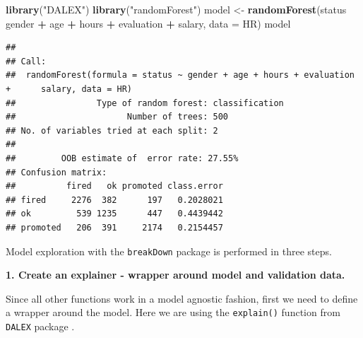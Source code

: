 \documentclass[]{book}
\newenvironment{Shaded}{\begin{snugshade}}{\end{snugshade}}
\newcommand{\ControlFlowTok}[1]{\textcolor[rgb]{0.13,0.29,0.53}{\textbf{#1}}}
\newcommand{\DataTypeTok}[1]{\textcolor[rgb]{0.13,0.29,0.53}{#1}}
\newcommand{\DecValTok}[1]{\textcolor[rgb]{0.00,0.00,0.81}{#1}}
\newcommand{\KeywordTok}[1]{\textcolor[rgb]{0.13,0.29,0.53}{\textbf{#1}}}
\newcommand{\NormalTok}[1]{#1}
\newcommand{\OperatorTok}[1]{\textcolor[rgb]{0.81,0.36,0.00}{\textbf{#1}}}
\newcommand{\StringTok}[1]{\textcolor[rgb]{0.31,0.60,0.02}{#1}}
\theoremstyle{definition}
\theoremstyle{definition}
\theoremstyle{definition}
\theoremstyle{remark}
\begin{document}
\begin{Shaded}
\begin{Highlighting}[]
\KeywordTok{library}\NormalTok{(}\StringTok{"DALEX"}\NormalTok{)}
\KeywordTok{library}\NormalTok{(}\StringTok{"randomForest"}\NormalTok{)}
\NormalTok{model <-}\StringTok{ }\KeywordTok{randomForest}\NormalTok{(status }\OperatorTok{~}\StringTok{ }\NormalTok{gender }\OperatorTok{+}\StringTok{ }\NormalTok{age }\OperatorTok{+}\StringTok{ }\NormalTok{hours }\OperatorTok{+}\StringTok{ }\NormalTok{evaluation }\OperatorTok{+}\StringTok{ }\NormalTok{salary, }\DataTypeTok{data =}\NormalTok{ HR)}
\NormalTok{model}
\end{Highlighting}
\end{Shaded}

\begin{verbatim}
## 
## Call:
##  randomForest(formula = status ~ gender + age + hours + evaluation +      salary, data = HR) 
##                Type of random forest: classification
##                      Number of trees: 500
## No. of variables tried at each split: 2
## 
##         OOB estimate of  error rate: 27.55%
## Confusion matrix:
##          fired   ok promoted class.error
## fired     2276  382      197   0.2028021
## ok         539 1235      447   0.4439442
## promoted   206  391     2174   0.2154457
\end{verbatim}

Model exploration with the \texttt{breakDown} package is performed in
three steps.

\textbf{1. Create an explainer - wrapper around model and validation
data.}

Since all other functions work in a model agnostic fashion, first we
need to define a wrapper around the model. Here we are using the
\texttt{explain()} function from \texttt{DALEX} package \citep{R-DALEX}.

\begin{Shaded}
\end{Shaded}
\end{document}
